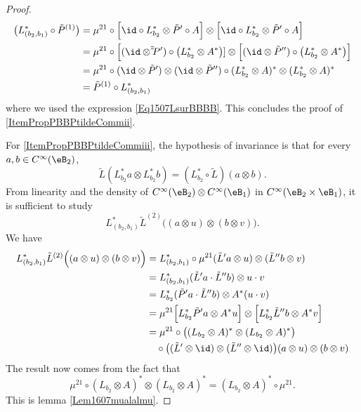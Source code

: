 \begin{proof}
	\begin{equation}
		\begin{aligned}[]
			\big( L^*_{(b_2,b_1)}\circ\tilde P^{(1)} \big)&=
			\mu^{21}\circ\Big[ \id\circ L^*_{b_2}\otimes\tilde P'\circ A \Big]\otimes\Big[  \id\circ L^*_{b_2}\otimes\tilde P'\circ A  \Big]\\
			&=\mu^{21}\circ\Big[(\id\otimes\tilde \tilde P')\circ\big( L^*_{b_2}\otimes A^* \big)]\otimes\Big[  (\id\otimes\tilde P'')\circ\big( L^*_{b_2}\otimes A^* \big)\Big]\\
			&=\mu^{21}\circ(\id\otimes \tilde P')\otimes(\id\otimes\tilde P'')\circ(L^*_{b_2}\otimes A)^*\otimes(L^*_{b_2}\otimes A)^*\\
			&=\tilde P^{(1)}\circ L^*_{(b_2,b_1)}
		\end{aligned}
	\end{equation}
	where we used the expression \eqref{Eq1507LsurBBBB}. This concludes the proof of \ref{ItemPropPBBPtildeCommii}.

	For \ref{ItemPropPBBPtildeCommiii}, the hypothesis of invariance is that for every $a,b\in C^{\infty}(\eB_2)$,
	\begin{equation}
		\tilde L(L^*_{b_2}a\otimes L^*_{b_2}b)=(L^*_{b_2}\circ\tilde L)(a\otimes b).
	\end{equation}
	From linearity and the density of $ C^{\infty}(\eB_2)\otimes C^{\infty}(\eB_1)$ in $ C^{\infty}(\eB_2\times\eB_1)$, it is sufficient to study 
	\begin{equation}
		L^*_{(b_2,b_1)}\tilde L^{(2)}\Big( (a\otimes u)\otimes(b\otimes v) \Big).
	\end{equation}
	We have
	\begin{equation}
		\begin{aligned}[]
			L^*_{(b_2,b_1)}\tilde L^{(2)}\Big( (a\otimes u)\otimes(b\otimes v) \Big)&=L^*_{(b_2,b_1)}\circ\mu^{21}(\tilde L'a\otimes u)\otimes (\tilde L''b\otimes v)\\
			&=L^*_{(b_2,b_1)}(\tilde L'a\cdot\tilde L''b)\otimes u\cdot v\\
			&=L^*_{b_2}(\tilde P'a\cdot\tilde L''b)\otimes A^*(u\cdot v)\\
			&=\mu^{21}\Big[ L^*_{b_2}\tilde P'a\otimes A^*u \Big]\otimes\Big[ L^*_{b_2}\tilde L''b\otimes A^*v \Big]\\
			&=\mu^{21}\circ\big( (L_{b_2}\otimes A)^*\otimes(L_{b_2}\otimes A)^* \big)\\
			&\quad	\circ\big( (\tilde L'\otimes\id)\otimes(\tilde L''\otimes\id) \big)(a\otimes u)\otimes(b\otimes v)
		\end{aligned}
	\end{equation}
	The result now comes from the fact that
	\begin{equation}
		\mu^{21}\circ(L_{b_2}\otimes A)^*\otimes(L_{b_2}\otimes A)^*=(L_{b_2}\otimes A)^*\circ\mu^{21}.
	\end{equation}
	This is lemma \ref{Lem1607mualalmu}.
\end{proof}

